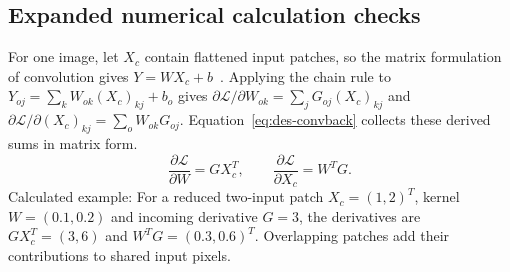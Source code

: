 \begin{designalgorithm}
\caption{One numerical training batch and validation checkpoint decision}
\label{alg:des-train}
\begin{designpseudo}
\end{designpseudo}
\end{designalgorithm}

\subsection{Expanded numerical calculation checks}\label{app:des-expanded-checks}

For one image, let $X_c$ contain flattened input patches, so the matrix formulation of convolution gives $Y=WX_c+b$~\cite[page to verify]{chellapilla2006}. Applying the chain rule to $Y_{oj}=\sum_k W_{ok}(X_c)_{kj}+b_o$ gives $\partial\mathcal L/\partial W_{ok}=\sum_j G_{oj}(X_c)_{kj}$ and $\partial\mathcal L/\partial(X_c)_{kj}=\sum_o W_{ok}G_{oj}$. Equation~\ref{eq:des-convback} collects these derived sums in matrix form.
\begin{equation}
\frac{\partial\mathcal L}{\partial W}=GX_c^T,\qquad
\frac{\partial\mathcal L}{\partial X_c}=W^TG.
\label{eq:des-convback}
\end{equation}
Calculated example: For a reduced two-input patch $X_c=(1,2)^T$, kernel $W=(0.1,0.2)$ and incoming derivative $G=3$, the derivatives are $GX_c^T=(3,6)$ and $W^TG=(0.3,0.6)^T$. Overlapping patches add their contributions to shared input pixels.

